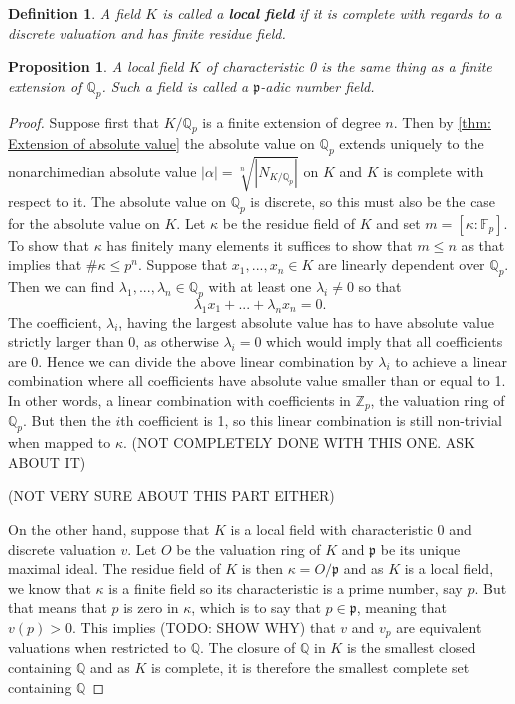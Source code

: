 \documentclass{article}
\newtheorem{definition}{Definition}[section]
\newtheorem{proposition}{Proposition}[section]
\newcommand{\mfrak}[1]{\mathfrak{#1}}
\newcommand{\mbb}[1]{\mathbb{#1}}
\begin{document}
\begin{definition}
    A field $K$ is called a \textbf{local field} if it is complete with regards to a discrete valuation and has finite residue field.
\end{definition}

\begin{proposition}\label{prop: Characterization of local fields}
    A local field $K$ of characteristic 0 is the same thing as a finite extension of $\mbb Q_p$. Such a field is called a $\mfrak p$-adic number field. 
\end{proposition}
\begin{proof}
    Suppose first that $K /\mbb Q_p$ is a finite extension of degree $n$. Then by \cref{thm: Extension of absolute value} the absolute value on $\mbb Q_p$ extends uniquely to the nonarchimedian absolute value $|\alpha| = \sqrt[n]{|N_{K/\mbb Q_p}|}$ on $K$ and $K$ is complete with respect to it. The absolute value on $\mbb Q_p$ is discrete, so this must also be the case for the absolute value on $K$. Let $\kappa$ be the residue field of $K$ and set $m = [\kappa : \mbb F_p]$. To show that $\kappa$ has finitely many elements it suffices to show that $m \leq n$ as that implies that $\# \kappa \leq p^n$. Suppose that $x_1, ..., x_n \in K$ are linearly dependent over $\mbb Q_p$. Then we can find $\lambda_1, ..., \lambda_n \in \mbb Q_p$ with at least one $\lambda_i \neq 0$ so that 
    $$\lambda_1 x_1 + ... + \lambda_n x_n = 0.$$ 
    The coefficient, $\lambda_i$, having the largest absolute value has to have absolute value strictly larger than 0, as otherwise $\lambda_i = 0$ which would imply that all coefficients are 0. Hence we can divide the above linear combination by $\lambda_i$ to achieve a linear combination where all coefficients have absolute value smaller than or equal to 1. In other words, a linear combination with coefficients in $\mbb Z_p$, the valuation ring of $\mbb Q_p$. But then the $i$th coefficient is 1, so this linear combination is still non-trivial when mapped to $\kappa$. (NOT COMPLETELY DONE WITH THIS ONE. ASK ABOUT IT)


    (NOT VERY SURE ABOUT THIS PART EITHER)

    On the other hand, suppose that $K$ is a local field with characteristic 0 and discrete valuation $v$. Let $O$ be the valuation ring of $K$ and $\mfrak p$ be its unique maximal ideal. The residue field of $K$ is then $\kappa = O / \mfrak p$ and as $K$ is a local field, we know that $\kappa$ is a finite field so its characteristic is a prime number, say $p$. But that means that $p$ is zero in $\kappa$, which is to say that $p \in \mfrak p$, meaning that $v(p) > 0$.  This implies (TODO: SHOW WHY) that $v$ and $v_p$ are equivalent valuations when restricted to $\mbb Q$. The closure of $\mbb Q$ in $K$ is the smallest closed containing $\mbb Q$ and as $K$ is complete, it is therefore the smallest complete set containing $\mbb Q$   
    

\end{proof}
\end{document}
